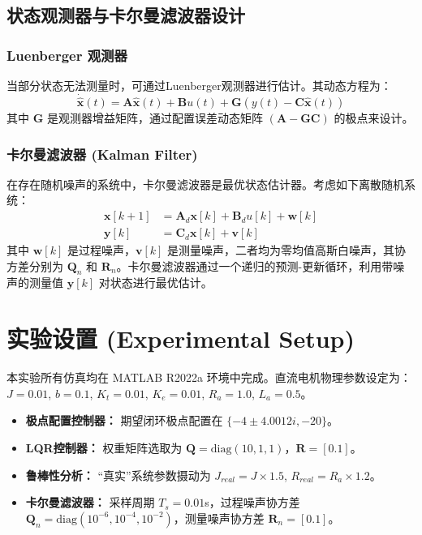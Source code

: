 \documentclass[12pt, a4paper]{article}
\begin{document}
\subsection{状态观测器与卡尔曼滤波器设计}
\subsubsection{Luenberger 观测器}
当部分状态无法测量时，可通过Luenberger观测器进行估计。其动态方程为：
\begin{equation}
    \dot{\hat{\bm{x}}}(t) = \bm{A}\hat{\bm{x}}(t) + \bm{B}u(t) + \bm{G}(y(t) - \bm{C}\hat{\bm{x}}(t))
    \label{eq:observer}
\end{equation}
其中 $\bm{G}$ 是观测器增益矩阵，通过配置误差动态矩阵 $(\bm{A} - \bm{G}\bm{C})$ 的极点来设计。

\subsubsection{卡尔曼滤波器 (Kalman Filter)}
在存在随机噪声的系统中，卡尔曼滤波器是最优状态估计器。考虑如下离散随机系统：
\begin{align}
    \bm{x}[k+1] &= \bm{A}_d \bm{x}[k] + \bm{B}_d u[k] + \bm{w}[k] \label{eq:kalman_state} \\
    \bm{y}[k] &= \bm{C}_d \bm{x}[k] + \bm{v}[k] \label{eq:kalman_obs}
\end{align}
其中 $\bm{w}[k]$ 是过程噪声，$\bm{v}[k]$ 是测量噪声，二者均为零均值高斯白噪声，其协方差分别为 $\bm{Q}_n$ 和 $\bm{R}_n$。卡尔曼滤波器通过一个递归的预测-更新循环，利用带噪声的测量值 $\bm{y}[k]$ 对状态进行最优估计。

\section{实验设置 (Experimental Setup)}
本实验所有仿真均在 MATLAB R2022a 环境中完成。直流电机物理参数设定为：$J=0.01$, $b=0.1$, $K_t=0.01$, $K_e=0.01$, $R_a=1.0$, $L_a=0.5$。
\begin{itemize}
    \item \textbf{极点配置控制器：} 期望闭环极点配置在 $\{-4 \pm 4.0012i, -20\}$。
    \item \textbf{LQR控制器：} 权重矩阵选取为 $\bm{Q} = \mathrm{diag}(10, 1, 1)$，$\bm{R} = [0.1]$。
    \item \textbf{鲁棒性分析：} “真实”系统参数摄动为 $J_{real} = J \times 1.5$, $R_{real} = R_a \times 1.2$。
    \item \textbf{卡尔曼滤波器：} 采样周期 $T_s=0.01$s，过程噪声协方差 $\bm{Q}_n=\mathrm{diag}(10^{-6}, 10^{-4}, 10^{-2})$，测量噪声协方差 $\bm{R}_n=[0.1]$。
\end{itemize}
\end{document}

